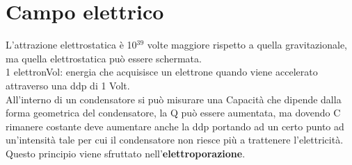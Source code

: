 \documentclass[10pt]{article}
\begin{document}
\section*{Campo elettrico}
L'attrazione elettrostatica è 10$^{39}$ volte maggiore rispetto a quella gravitazionale, ma quella elettrostatica può essere schermata.\\
1 elettronVol: energia che acquisisce un elettrone quando viene accelerato attraverso una ddp di 1 Volt.\\
All'interno di un condensatore si può misurare una Capacità che dipende dalla forma geometrica del condensatore, la Q può essere aumentata, ma dovendo C rimanere costante deve aumentare anche la ddp portando ad un certo punto ad un'intensità tale per cui il condensatore non riesce più a trattenere l'elettricità. Questo principio viene sfruttato nell'\textbf{elettroporazione}.
\end{document}
